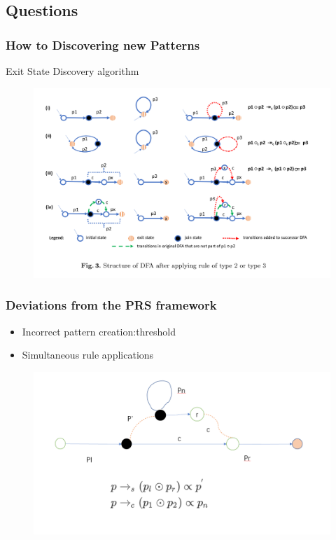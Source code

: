 \documentclass[aspectratio=169%
,serif,mathserif]{beamer}
\begin{document}
\subsection{Questions}
\begin{frame}
	\frametitle{How to Discovering new Patterns}
	Exit State Discovery algorithm
	\begin{figure}
		\includegraphics[width=0.6\linewidth]{2.png}
	\end{figure}
\end{frame}

\begin{frame}
	\frametitle{Deviations from the PRS framework}
	\begin{itemize}
		\item Incorrect pattern creation:threshold
		\item Simultaneous rule applications
	\end{itemize}

	\begin{figure}
		\includegraphics[width=0.6\linewidth]{6.png}
	\end{figure}
\end{frame}
\end{document}
